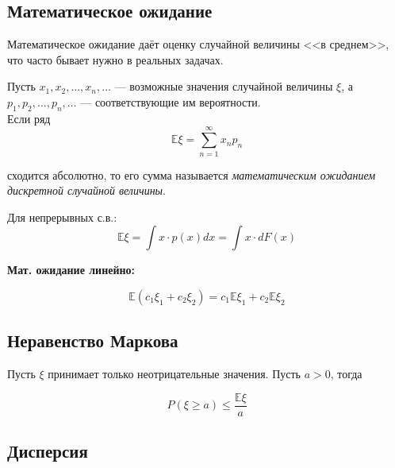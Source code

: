 \subsection{Математическое ожидание}

Математическое ожидание даёт оценку случайной величины <<в среднем>>, что часто бывает нужно в реальных задачах.

\begin{definition}
    Пусть $x_1, x_2, \ldots, x_n, \ldots$ --- возможные значения случайной величины $\xi$, а $p_1, p_2, \ldots, p_n, \ldots$ --- соответствующие им вероятности. \\
    Если ряд     
    \begin{equation}
        \mathbb{E} \xi = \sum_{n=1}^\infty x_n p_n   
    \end{equation}
    
    сходится абсолютно, то его сумма называется \textit{математическим ожиданием дискретной случайной величины}.

    Для непрерывных с.в.:
    \begin{equation}
        \mathbb{E}\xi = \int x \cdot p(x) dx = \int x \cdot d F(x)
    \end{equation}

    \textbf{Мат. ожидание линейно:}

    \begin{equation}
        \mathbb{E}(c_1 \xi_1 + c_2 \xi_2) = c_1 \mathbb{E} \xi_1 + c_2 \mathbb{E} \xi_2 
    \end{equation}
\end{definition}

\subsection{Неравенство Маркова}

\begin{theorem}[(Маркова)]
    Пусть $\xi$ принимает только неотрицательные значения. Пусть $a > 0$, тогда

\begin{equation}
    P(\xi \geq a) \leq \frac{\mathbb{E}\xi}{a}
\end{equation}
\end{theorem}

\subsection{Дисперсия}

